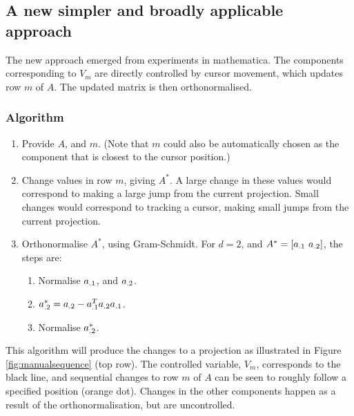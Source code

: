 \documentclass[]{interact}
\theoremstyle{plain}%
\theoremstyle{definition}
\theoremstyle{remark}
\providecommand{\tightlist}{%
  \setlength{\itemsep}{0pt}\setlength{\parskip}{0pt}}
\def\tightlist{}
\begin{document}
\hypertarget{a-new-simpler-and-broadly-applicable-approach}{%
\subsection{A new simpler and broadly applicable
approach}\label{a-new-simpler-and-broadly-applicable-approach}}

The new approach emerged from experiments in mathematica. The components
corresponding to \(V_m\) are directly controlled by cursor movement,
which updates row \(m\) of \(A\). The updated matrix is then
orthonormalised.

\hypertarget{algorithm}{%
\subsubsection{Algorithm}\label{algorithm}}

\begin{enumerate}
\def\labelenumi{\arabic{enumi}.}
\item
  Provide \(A\), and \(m\). (Note that \(m\) could also be automatically
  chosen as the component that is closest to the cursor position.)
\item
  Change values in row \(m\), giving \(A^*\). A large change in these
  values would correspond to making a large jump from the current
  projection. Small changes would correspond to tracking a cursor,
  making small jumps from the current projection.
\item
  Orthonormalise \(A^*\), using Gram-Schmidt. For \(d=2\), and
  \(A^* = \left[ {\boldmath a}_{.1}~{\boldmath a}_{.2}\right]\), the
  steps are:

  \begin{enumerate}
  \def\labelenumii{\roman{enumii}.}
  \tightlist
  \item
    Normalise \({\boldmath a}_{.1}\), and \({\boldmath a}_{.2}\).
  \item
    \({\boldmath a}^*_{.2} = {\boldmath a}_{.2} - {\boldmath a}_{.1}^T{\boldmath a}_{.2}{\boldmath a}_{.1}\).
  \item
    Normalise \({\boldmath a}^*_{.2}\).
  \end{enumerate}
\end{enumerate}

This algorithm will produce the changes to a projection as illustrated
in Figure \ref{fig:manualsequence} (top row). The controlled variable,
\(V_m\), corresponds to the black line, and sequential changes to row
\(m\) of \(A\) can be seen to roughly follow a specified position
(orange dot). Changes in the other components happen as a result of the
orthonormalisation, but are uncontrolled.
\end{document}
